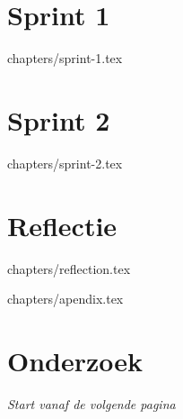\documentclass{article}
\begin{document}
\section{Sprint 1}
{chapters/sprint-1.tex}
\clearpage

\section{Sprint 2}
{chapters/sprint-2.tex}
\clearpage

\section{Reflectie}
{chapters/reflection.tex}
\clearpage

\appendix
{chapters/apendix.tex}
\section{Onderzoek}
\textit{Start vanaf de volgende pagina}

\clearpage

\printbibliography[heading=bibintoc]
\clearpage
\end{document}
